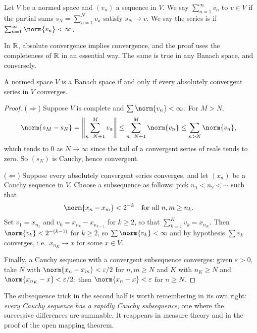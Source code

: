 \documentclass[a4paper]{scrartcl}
\begin{document}
\begin{definition}
	Let $V$ be a normed space and $(v_n)$ a sequence in $V$. We say $\sum_{n=1}^\infty v_n$  to $v \in V$ if the partial sums $s_N = \sum_{n=1}^N v_n$ satisfy $s_N \to v$. We say the series is  if $\sum_{n=1}^\infty \norm{v_n} < \infty$.
\end{definition}

In $\mathbb{R}$, absolute convergence implies convergence, and the proof uses the completeness of $\mathbb{R}$ in an essential way. The same is true in any Banach space, and conversely.

\begin{theorem}
	A normed space $V$ is a Banach space if and only if every absolutely convergent series in $V$ converges.
\end{theorem}

\begin{proof}
	($\Rightarrow$) Suppose $V$ is complete and $\sum \norm{v_n} < \infty$. For $M > N$,
	$$\norm{s_M - s_N} = \left\| \sum_{n=N+1}^M v_n \right\| \leq \sum_{n=N+1}^M \norm{v_n} \leq \sum_{n > N} \norm{v_n},$$
	which tends to $0$ as $N \to \infty$ since the tail of a convergent series of reals tends to zero. So $(s_N)$ is Cauchy, hence convergent.

	($\Leftarrow$) Suppose every absolutely convergent series converges, and let $(x_n)$ be a Cauchy sequence in $V$. Choose a subsequence as follows: pick $n_1 < n_2 < \cdots$ such that
	$$\norm{x_n - x_m} < 2^{-k} \quad \text{for all } n, m \geq n_k.$$
	Set $v_1 = x_{n_1}$ and $v_k = x_{n_k} - x_{n_{k-1}}$ for $k \geq 2$, so that $\sum_{k=1}^K v_k = x_{n_K}$. Then $\norm{v_k} < 2^{-(k-1)}$ for $k \geq 2$, so $\sum \norm{v_k} < \infty$ and by hypothesis $\sum v_k$ converges, i.e.\ $x_{n_K} \to x$ for some $x \in V$.

	Finally, a Cauchy sequence with a convergent subsequence converges: given $\varepsilon > 0$, take $N$ with $\norm{x_n - x_m} < \varepsilon/2$ for $n,m \geq N$ and $K$ with $n_K \geq N$ and $\norm{x_{n_K} - x} < \varepsilon/2$; then $\norm{x_n - x} < \varepsilon$ for $n \geq N$.
\end{proof}

\begin{remark}
	The subsequence trick in the second half is worth remembering in its own right: \emph{every Cauchy sequence has a rapidly Cauchy subsequence}, one where the successive differences are summable. It reappears in measure theory and in the proof of the open mapping theorem.
\end{remark}
\end{document}
